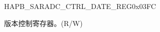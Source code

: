 \begin{register}{H}{APB\_SARADC\_CTRL\_DATE\_REG}{0x03FC}\label{regdesc:APBSARADCCTRLDATEREG}
%
\regnewline%
\begin{regdesc}\begin{reglist}
\label{fielddesc:APBSARADCDATE}\item [APB\_SARADC\_DATE] 版本控制寄存器。(R/W)
\end{reglist}\end{regdesc}
\end{register}
